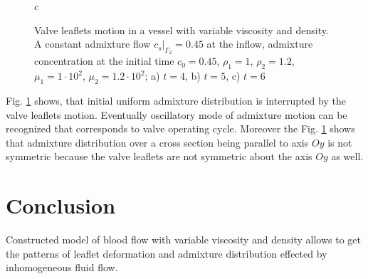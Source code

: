 \documentclass[runningheads,a4paper]{llncs}
\begin{document}
\begin{figure}
$c$

\caption{Valve leaflets motion in a vessel with variable viscosity and density. A constant admixture flow $c_s|_{\Gamma_2} = 0.45$ at the inflow,
admixture concentration at the initial time $c_0 = 0.45$, $\rho_1=1$, $\rho_2=1.2$, $\mu_1 = 1 \cdot 10^2$, $\mu_2 = 1.2 \cdot 10^2$;
a) $t = 4$, b) $t=5$, c) $t=6$}
\label{fig:valve_in_mixture}
\end{figure}

Fig. \ref{fig:valve_in_mixture} shows, that initial uniform admixture distribution is interrupted by the valve leaflets motion. Eventually oscillatory mode of
admixture motion can be recognized that corresponds to valve operating cycle. 
Moreover the Fig. \ref{fig:valve_in_mixture} shows that admixture distribution over a cross section being parallel to axis $Oy$
is not symmetric because the valve leaflets are not symmetric about the axis $Oy$ as well.

\section{Conclusion}

Constructed model of blood flow with variable viscosity and density allows to get the patterns of leaflet deformation and admixture distribution 
effected by inhomogeneous fluid flow.
\end{document}
